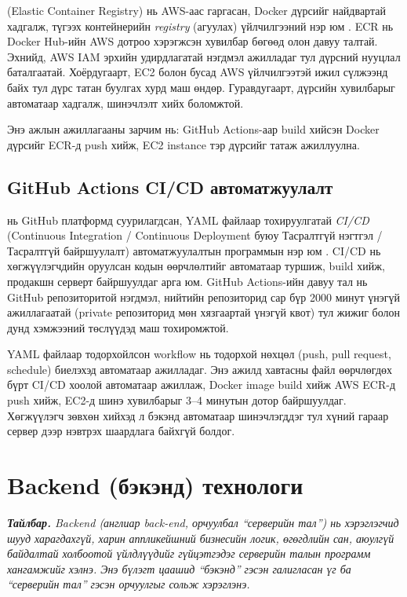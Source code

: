  (Elastic Container Registry) нь AWS-аас гаргасан, Docker дүрсийг найдвартай хадгалж, түгээх контейнерийн \textit{registry} (агуулах) үйлчилгээний нэр юм \cite{aws_ecr_doc}. ECR нь Docker Hub-ийн AWS дотроо хэрэгжсэн хувилбар бөгөөд олон давуу талтай. Эхнийд, AWS IAM эрхийн удирдлагатай нэгдмэл ажилладаг тул дүрсний нууцлал баталгаатай. Хоёрдугаарт, EC2 болон бусад AWS үйлчилгээтэй ижил сүлжээнд байх тул дүрс татан буулгах хурд маш өндөр. Гуравдугаарт, дүрсийн хувилбарыг автоматаар хадгалж, шинэчлэлт хийх боломжтой.

Энэ ажлын ажиллагааны зарчим нь: GitHub Actions-аар build хийсэн Docker дүрсийг ECR-д push хийж, EC2 instance тэр дүрсийг татаж ажиллуулна.

\subsection*{GitHub Actions CI/CD автоматжуулалт}

 нь GitHub платформд суурилагдсан, YAML файлаар тохируулгатай \textit{CI/CD} (Continuous Integration / Continuous Deployment буюу Тасралтгүй нэгтгэл / Тасралтгүй байршуулалт) автоматжуулалтын программын нэр юм \cite{github_actions_doc}. CI/CD нь хөгжүүлэгчдийн оруулсан кодын өөрчлөлтийг автоматаар туршиж, build хийж, продакшн серверт байршуулдаг арга юм. GitHub Actions-ийн давуу тал нь GitHub репозиторитой нэгдмэл, нийтийн репозиторид сар бүр 2000 минут үнэгүй ажиллагаатай (private репозиторид мөн хязгаартай үнэгүй квот) тул жижиг болон дунд хэмжээний төслүүдэд маш тохиромжтой.

YAML файлаар тодорхойлсон workflow нь тодорхой нөхцөл (push, pull request, schedule) биелэхэд автоматаар ажилладаг. Энэ ажилд  хавтасны файл өөрчлөгдөх бүрт CI/CD хоолой автоматаар ажиллаж, Docker image build хийж AWS ECR-д push хийж, EC2-д шинэ хувилбарыг 3--4 минутын дотор байршуулдаг. Хөгжүүлэгч зөвхөн  хийхэд л бэкэнд автоматаар шинэчлэгддэг тул хүний гараар сервер дээр нэвтрэх шаардлага байхгүй болдог.


\section{Backend (бэкэнд) технологи}

\noindent\textit{\textbf{Тайлбар.} Backend (англиар \textit{back-end}, орчуулбал ``серверийн тал'') нь хэрэглэгчид шууд харагдахгүй, харин аппликейшний бизнесийн логик, өгөгдлийн сан, аюулгүй байдалтай холбоотой үйлдлүүдийг гүйцэтгэдэг серверийн талын программ хангамжийг хэлнэ. Энэ бүлэгт цаашид ``бэкэнд'' гэсэн галигласан үг ба ``серверийн тал'' гэсэн орчуулгыг сольж хэрэглэнэ.}


